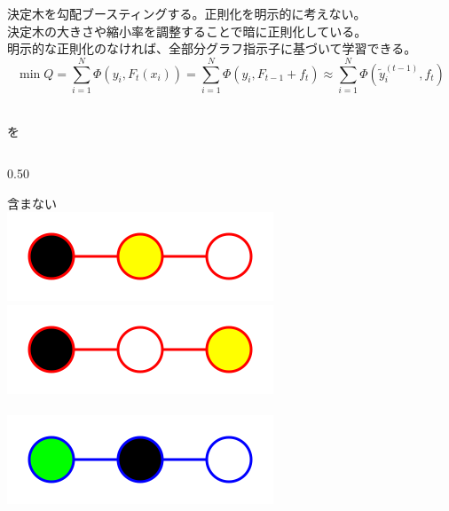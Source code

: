 \begin{tcolorbox}[title={\Large Gradient~Boosting~Decition~Tree}]
	決定木を勾配ブースティングする。正則化を明示的に考えない。 \\
	決定木の大きさや縮小率を調整することで暗に正則化している。 \\
	明示的な正則化のなければ、全部分グラフ指示子に基づいて学習できる。 \\
	\[
		\min Q
		= \sum^N_{i=1} \Phi(y_i, F_t(x_i)) 
		= \sum^N_{i=1} \Phi(y_i, F_{t-1} + f_t) 
		\approx \sum^N_{i=1} \Phi(\tilde{y}^{(t-1)}_i, f_t) 
	\]


	 \\
	を \\
	\vspace{-60px}
	\begin{columns}[t]
		\begin{column}{0.50\hsize}
			\begin{tcolorbox}[colback=white]
				含まない \\
				\includegraphics[height=1\baselineskip]{img/graph/g02r.png} \hspace{30px}
				\includegraphics[height=1\baselineskip]{img/graph/g03r.png} \\
				\vspace{10px} \\
				\includegraphics[height=1\baselineskip]{img/graph/g04b.png} \\

\end{tcolorbox}
\end{column}
\end{columns}
\end{tcolorbox}

